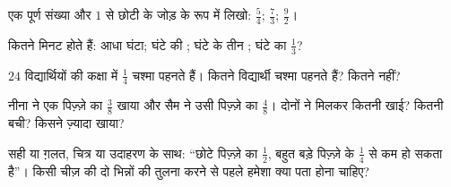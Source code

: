 \begin{exercise}[$\star$]\label{exo:g4:fractions:7}
एक पूर्ण संख्या और $1$ से छोटी  के जोड़ के रूप में लिखो:
$\frac54$; \quad $\frac73$; \quad $\frac{9}{2}$।
\end{exercise}

\begin{exercise}[$\star$]\label{exo:g4:fractions:8}
कितने मिनट होते हैं: आधा घंटा; घंटे की ; घंटे के तीन
; घंटे का $\frac13$?
\end{exercise}

\begin{exercise}[$\star$]\label{exo:g4:fractions:9}
$24$ विद्यार्थियों की कक्षा में $\frac14$ चश्मा पहनते हैं। कितने
विद्यार्थी चश्मा पहनते हैं? कितने नहीं?
\end{exercise}

\begin{exercise}[$\star\star$]\label{exo:g4:fractions:10}
नीना ने एक पिज़्ज़े का $\frac38$ खाया और सैम ने उसी पिज़्ज़े का
$\frac48$। दोनों ने मिलकर कितनी  खाई? कितनी बची?
किसने ज़्यादा खाया?
\end{exercise}

\begin{exercise}[$\star\star$]\label{exo:g4:fractions:11}
सही या ग़लत, चित्र या उदाहरण के साथ: ``छोटे पिज़्ज़े का
$\frac12$, बहुत बड़े पिज़्ज़े के $\frac14$ से कम हो सकता है''।
किसी चीज़ की दो भिन्नों की तुलना करने से पहले हमेशा क्या पता
होना चाहिए?
\end{exercise}
